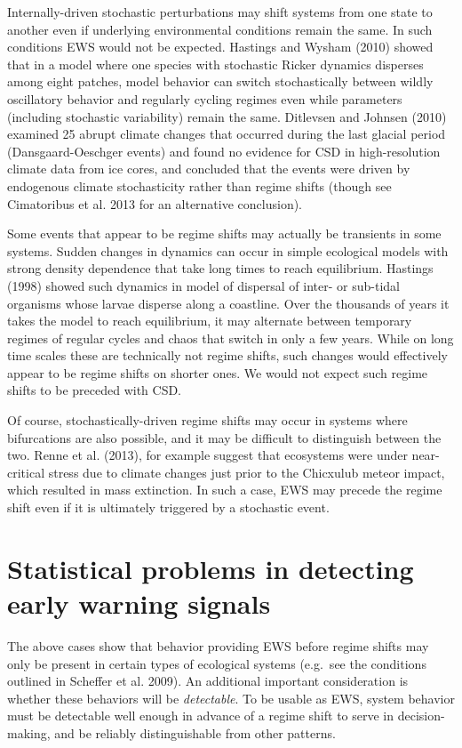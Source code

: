 \documentclass{article}
\begin{document}
Internally-driven stochastic perturbations may shift systems from one
state to another even if underlying environmental conditions remain the
same. In such conditions EWS would not be expected. Hastings and Wysham
(2010) showed that in a model where one species with stochastic Ricker
dynamics disperses among eight patches, model behavior can switch
stochastically between wildly oscillatory behavior and regularly cycling
regimes even while parameters (including stochastic variability) remain
the same. Ditlevsen and Johnsen (2010) examined 25 abrupt climate
changes that occurred during the last glacial period (Dansgaard-Oeschger
events) and found no evidence for CSD in high-resolution climate data
from ice cores, and concluded that the events were driven by endogenous
climate stochasticity rather than regime shifts (though see Cimatoribus
et al. 2013 for an alternative conclusion).

Some events that appear to be regime shifts may actually be transients
in some systems. Sudden changes in dynamics can occur in simple
ecological models with strong density dependence that take long times to
reach equilibrium. Hastings (1998) showed such dynamics in model of
dispersal of inter- or sub-tidal organisms whose larvae disperse along a
coastline. Over the thousands of years it takes the model to reach
equilibrium, it may alternate between temporary regimes of regular
cycles and chaos that switch in only a few years. While on long time
scales these are technically not regime shifts, such changes would
effectively appear to be regime shifts on shorter ones. We would not
expect such regime shifts to be preceded with CSD.

Of course, stochastically-driven regime shifts may occur in systems
where bifurcations are also possible, and it may be difficult to
distinguish between the two. Renne et al. (2013), for example suggest
that ecosystems were under near-critical stress due to climate changes
just prior to the Chicxulub meteor impact, which resulted in mass
extinction. In such a case, EWS may precede the regime shift even if it
is ultimately triggered by a stochastic event.

\section{Statistical problems in detecting early warning signals}

The above cases show that behavior providing EWS before regime shifts
may only be present in certain types of ecological systems (e.g.~see the
conditions outlined in Scheffer et al. 2009). An additional important
consideration is whether these behaviors will be \emph{detectable}. To
be usable as EWS, system behavior must be detectable well enough in
advance of a regime shift to serve in decision-making, and be reliably
distinguishable from other patterns.
\end{document}

